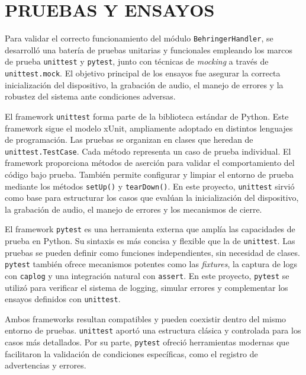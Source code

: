\clearpage
\section{PRUEBAS Y ENSAYOS}

Para validar el correcto funcionamiento del módulo \texttt{BehringerHandler}, se desarrolló una batería de pruebas unitarias y funcionales empleando los marcos de prueba \texttt{unittest} y \texttt{pytest}, junto con técnicas de \textit{mocking} a través de \texttt{unittest.mock}. El objetivo principal de los ensayos fue asegurar la correcta inicialización del dispositivo, la grabación de audio, el manejo de errores y la robustez del sistema ante condiciones adversas.

El framework \texttt{unittest} forma parte de la biblioteca estándar de Python. Este framework sigue el modelo xUnit, ampliamente adoptado en distintos lenguajes de programación. Las pruebas se organizan en clases que heredan de \texttt{unittest.TestCase}. Cada método representa un caso de prueba individual. El framework proporciona métodos de aserción para validar el comportamiento del código bajo prueba. También permite configurar y limpiar el entorno de prueba mediante los métodos \texttt{setUp()} y \texttt{tearDown()}. En este proyecto, \texttt{unittest} sirvió como base para estructurar los casos que evalúan la inicialización del dispositivo, la grabación de audio, el manejo de errores y los mecanismos de cierre.

El framework \texttt{pytest} es una herramienta externa que amplía las capacidades de prueba en Python. Su sintaxis es más concisa y flexible que la de \texttt{unittest}. Las pruebas se pueden definir como funciones independientes, sin necesidad de clases. \texttt{pytest} también ofrece mecanismos potentes como las \textit{fixtures}, la captura de logs con \texttt{caplog} y una integración natural con \texttt{assert}. En este proyecto, \texttt{pytest} se utilizó para verificar el sistema de logging, simular errores y complementar los ensayos definidos con \texttt{unittest}.

Ambos frameworks resultan compatibles y pueden coexistir dentro del mismo entorno de pruebas. \texttt{unittest} aportó una estructura clásica y controlada para los casos más detallados. Por su parte, \texttt{pytest} ofreció herramientas modernas que facilitaron la validación de condiciones específicas, como el registro de advertencias y errores.

